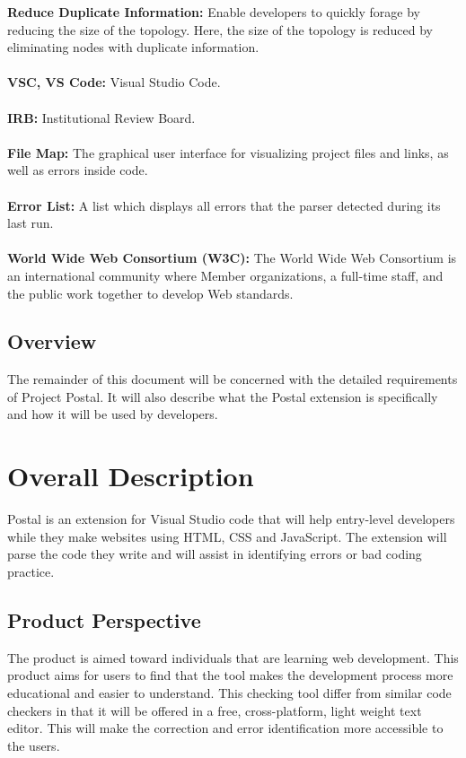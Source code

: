 \documentclass[letterpaper,10pt,titlepage,draftclsnofoot,onecolumn,onesided] {IEEEtran}
\begin{document}
\textbf{Reduce Duplicate Information:} 
Enable developers to quickly forage by reducing the size of the topology. Here, the size of the topology is reduced by eliminating nodes with duplicate information.\cite{iftwiki}\\\\
\textbf{VSC, VS Code:}
Visual Studio Code.\\\\
\textbf{IRB:} 
Institutional Review Board.\\\\
\textbf{File Map:} 
The graphical user interface for visualizing project files and links, as well as errors inside code.\\\\
\textbf{Error List:}
A list which displays all errors that the parser detected during its last run.\\\\
\textbf{World Wide Web Consortium (W3C):}
The World Wide Web Consortium is an international community where Member organizations, a full-time staff, and the public work together to develop Web standards. \cite{w3}



\begingroup


\endgroup

\subsection{Overview}
The remainder of this document will be concerned with the detailed requirements of Project Postal.
It will also describe what the Postal extension is specifically and how it will be used by developers.

\section{Overall Description}
Postal is an extension for Visual Studio code that will help entry-level developers while they make websites using HTML, CSS and JavaScript. 
The extension will parse the code they write and will assist in identifying errors or bad coding practice.

\subsection{Product Perspective}
The product is aimed toward individuals that are learning web development. This product aims for users to find that the tool makes the development process more educational and easier to understand. 
This checking tool differ from similar code checkers in that it will be offered in a free, cross-platform, light weight text editor.
This will make the correction and error identification more accessible to the users.
\end{document}
